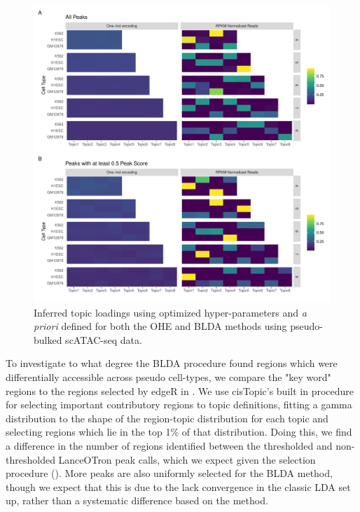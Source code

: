 \begin{figure}
  \centering
  \includegraphics[width = \textwidth]{plot/ch4/pb_thresholding_topics.pdf}
  \caption{Inferred topic loadings using optimized hyper-parameters and \textit{a priori} defined for both the OHE and BLDA methods using pseudo-bulked scATAC-seq data.}
  \label{fig:pb_no_thresh_lot_topics}
\end{figure}

To investigate to what degree the BLDA procedure found regions which were differentially accessible across pseudo cell-types, we compare the "key word" regions to the regions selected by edgeR in . We use cisTopic's built in procedure for selecting important contributory regions to topic definitions, fitting a gamma distribution to the shape of the region-topic distribution for each topic and selecting regions which lie in the top 1\% of that distribution. Doing this, we find a difference in the number of regions identified between the thresholded and non-thresholded LanceOTron peak calls, which we expect given the selection procedure (). More peaks are also uniformly selected for the BLDA method, though we expect that this is due to the lack convergence in the classic LDA set up, rather than a systematic difference based on the method. 

